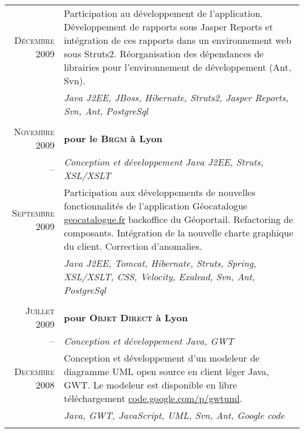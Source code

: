 \documentclass[a4paper,10pt]{article}
\begin{document}
\begin{supertabular}{r|p{11cm}}
  \footnotesize{\textsc{Décembre 2009}}  & \footnotesize{Participation au développement de l'application. Développement de rapports sous Jasper Reports et intégration de ces rapports dans un environnement web sous Struts2. Réorganisation des dépendances de librairies pour l'environnement de développement (Ant, Svn).} \\
  & \emph{Java J2EE, JBoss, Hibernate, Struts2, Jasper Reports, Svn, Ant, PostgreSql}                                    \\
                                                                                                     \\
  \textsc{Novembre 2009} & \textbf{pour le \textsc{Brgm} à Lyon}                                                         \\ 
  -- & \emph{Conception et développement Java J2EE, Struts, XSL/XSLT}                                                   \\
  \footnotesize{\textsc{Septembre 2009}} & \footnotesize{Participation aux développements de nouvelles fonctionnalités de l'application Géocatalogue \href{http://www.geocatalogue.fr}{geocatalogue.fr} backoffice du Géoportail. Refactoring de composants. Intégration de la nouvelle charte graphique du client. Correction d'anomalies.} \\
  & \emph{Java J2EE, Tomcat, Hibernate, Struts, Spring, XSL/XSLT, CSS, Velocity, Exalead, Svn, Ant, PostgreSql}          \\
                                                                                                     \\
  \textsc{Juillet 2009} & \textbf{pour \textsc{Objet Direct} à Lyon}                                                     \\
  -- & \emph{Conception et développement Java, GWT}                                                                     \\
  \footnotesize{\textsc{Decembre 2008}}& \footnotesize{Conception et développement d’un modeleur de diagramme UML open source en client léger Java, GWT. Le modeleur est disponible en libre téléchargement \href{http://code.google.com/p/gwtuml/}{code.google.com/p/gwtuml}.} \\
  & \emph{Java, GWT, JavaScript, UML, Svn, Ant, Google code}                                                             \\
                                                                                                     \\

\end{supertabular}
\end{document}
